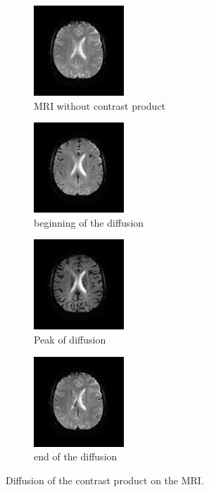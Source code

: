 \begin{figure}
\centering
\begin{subfigure}[t]{0.22\textwidth}
\centering
    \vspace{0.00\textheight}
    \includegraphics[scale=0.9,angle=0]{Im1.png}
    \caption{MRI without contrast product}
    \label{fig:without} 
\end{subfigure}
\begin{subfigure}[t]{0.22\textwidth}
\centering
    \vspace{0.00\textheight}
    \includegraphics[scale=0.9,angle=0]{Im7.png}
    \caption{beginning of the diffusion}
    \label{fig:First} 
\end{subfigure}
\begin{subfigure}[t]{0.22\textwidth}
\centering
    \vspace{0.00\textheight}
    \includegraphics[scale=0.9,angle=0]{Im8.png}
    \caption{Peak of diffusion}
    \label{fig:Second} 
\end{subfigure}
\begin{subfigure}[t]{0.22\textwidth}
\centering
    \vspace{0.00\textheight}
    \includegraphics[scale=0.9,angle=0]{Im13.png}
    \caption{end of the diffusion}
    \label{fig:Last} 
\end{subfigure}
    \caption{Diffusion of the contrast product on the MRI.}
    \label{fig:diffusion} 
\end{figure}

